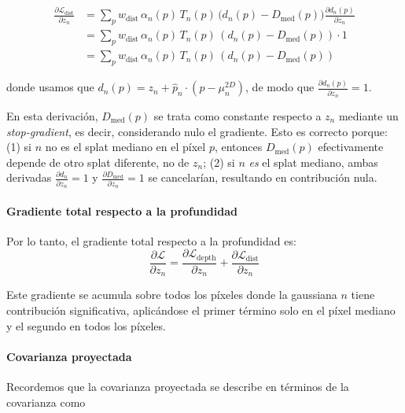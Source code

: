 \begin{equation}
\begin{split}
\frac{\partial \mathcal{L}_{\text{dist}}}{\partial z_n} &= \sum_{p} w_{\text{dist}} \, \alpha_n(p)\,T_n(p)\, \big(d_n(p) - D_{\text{med}}(p)\big) \frac{\partial d_n(p)}{\partial z_n} \\
&= \sum_{p} w_{\text{dist}} \, \alpha_n(p) \, T_n(p) \, (d_n(p) - D_{\text{med}}(p)) \cdot 1 \\
&= \sum_p w_{\text{dist}} \, \alpha_n(p) \, T_n(p) \, (d_n(p) - D_{\text{med}}(p))
\end{split}
\end{equation}

\noindent donde usamos que $d_n(p) = z_n + \hat{p}_n \cdot (p - \mu_n^{2D})$, de modo que $\frac{\partial d_n(p)}{\partial z_n} = 1$. 


En esta derivación, $D_{\text{med}}(p)$ se trata como constante respecto a $z_n$ mediante un \textit{stop-gradient}, es decir, considerando nulo el gradiente. Esto es correcto porque: (1) si $n$ no es el splat mediano en el píxel $p$, entonces $D_{\text{med}}(p)$ efectivamente depende de otro splat diferente, no de $z_n$; (2) si $n$ \emph{es} el splat mediano, ambas derivadas $\frac{\partial d_n}{\partial z_n} = 1$ y $\frac{\partial D_{\text{med}}}{\partial z_n} = 1$ se cancelarían, resultando en contribución nula.


\paragraph{Gradiente total respecto a la profundidad}

Por lo tanto, el gradiente total respecto a la profundidad es:
\begin{equation}
\frac{\partial \mathcal{L}}{\partial z_n} = \frac{\partial \mathcal{L}_{\text{depth}}}{\partial z_n} + \frac{\partial \mathcal{L}_{\text{dist}}}{\partial z_n}
\end{equation}

Este gradiente se acumula sobre todos los píxeles donde la gaussiana $n$ tiene contribución significativa, aplicándose el primer término solo en el píxel mediano y el segundo en todos los píxeles.



\paragraph{Covarianza proyectada}

Recordemos que la covarianza proyectada se describe en términos de la covarianza como

